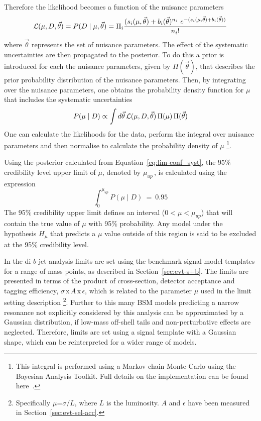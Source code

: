 Therefore the likelihood becomes a function of the nuisance parameters
\begin{equation}
  \mathcal{L} (\mu,D,\vec{\theta}) = P(D \mid \mu, \vec{\theta} ) =  \Pi_i \frac{(s_i(\mu,\vec{\theta})+b_i(\vec{\theta})^{n_i}~e^{-(s_i(\mu,\vec{\theta})+b_i(\vec{\theta}))}}{n_i!}
\end{equation}
where $\vec{\theta}$ represents the set of nuisance parameters.
The effect of the systematic uncertainties are then propagated to the posterior. %
To do this a prior is introduced for each the nuisance parameters, given by $\Pi(\vec{\theta})$,
that describes the prior probability distribution of the nuisance parameters.
Then, by integrating over the nuisance parameters,
one obtains the probability density function for $\mu$ that includes the systematic uncertainties
\begin{equation}
  P(\mu \mid D) \propto \int d \vec{\theta} \, \mathcal{L} (\mu, D, \vec{\theta} ) \, \Pi( \mu )  \, \Pi(\vec{\theta})
  \label{eq:lim-conf_syst}
\end{equation}
One can calculate the likelihoods for the data,
perform the integral over nuisance parameters
and then normalise to calculate the probability density of $\mu$
\footnote{This integral is performed using a Markov chain Monte-Carlo using the Bayesian Analysis Toolkit.
 Full details on the implementation can be found here~\cite{det-thesis_kate}.}.

Using the posterior calculated from Equation~\ref{eq:lim-conf_syst},
the 95\% credibility level upper limit of $\mu$, denoted by $\mu_{up}\,$,
is calculated using the expression
\begin{equation}
\int_0^{\mu_{up}} P(\mu \mid D)~=~0.95
\end{equation}
The 95\% credibility upper limit defines an interval ($0 < \mu < \mu_{up}$)
that will contain the true value of $\mu$ with 95\% probability.
Any model under the hypothesis $H_{\mu}$ that predicts a $\mu$
value outside of this region is said to be excluded at the 95\% credibility level.

In the di-$b$-jet analysis limits are set using the benchmark signal model templates for a range of mass points,
as described in Section~\ref{sec:evt-s+b}.
The limits are presented in terms of the product of cross-section, detector acceptance and tagging efficiency,
$\sigma\,\text{x}\,\mathit{A}\,\text{x}\,\epsilon$,
which is related to the parameter $\mu$ used in the limit setting description
\footnote{
  Specifically $\mu$=$\sigma/L$, where $L$ is the luminosity.
  $\mathit{A}$ and $\epsilon$ have been measured in Section~\ref{sec:evt-sel-acc}.
}.
Further to this
many BSM models predicting a narrow resonance
not explicitly considered by this analysis
can be approximated by a Gaussian distribution,
if low-mass off-shell tails and non-perturbative effects are neglected.
Therefore, limits are set using a signal template with a Gaussian shape,
which can be reinterpreted for a wider range of models.
  
